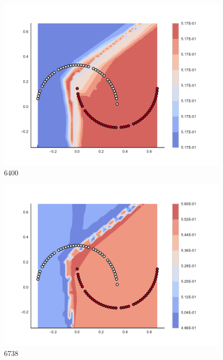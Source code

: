 \begin{subfigure}[b]{0.09\textwidth}
    \includegraphics[width=\textwidth]{img/convergence/6400.pdf}
    \caption{6400}
    \label{fig:convergence_6400}
\end{subfigure}
%
\begin{subfigure}[b]{0.09\textwidth}
    \includegraphics[width=\textwidth]{img/convergence/6738.pdf}
    \caption{6738}
    \label{fig:convergence_6738}
\end{subfigure}
%
